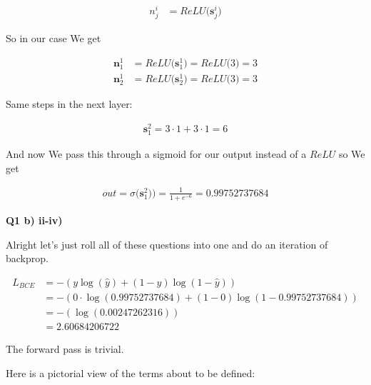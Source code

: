 \documentclass{article}
\begin{document}
	\begin{align}
		n^i_j &= ReLU\big(\mathbf{s}^i_j\big)
	\end{align}
	
	So in our case We get
	
	\begin{align}
		\mathbf{n}^1_1 &= ReLU\big(\mathbf{s}^1_1\big) =  ReLU\big( 3 \big) = 3\\
	\mathbf{n}^1_2 &= ReLU\big(\mathbf{s}^1_2\big) =  ReLU\big( 3 \big) = 3	
	\end{align}
	
	Same steps in the next layer:
	
	\begin{align}
		\mathbf{s}^2_1 = 3\cdot 1 + 3\cdot 1 = 6
	\end{align}
	
	And now We pass this through a sigmoid for our output instead of a $ReLU$ so We get
	
	\begin{align}
		out = \sigma\big(\mathbf{s}^2_1)\big) = \frac{1}{1+e^{-6}} = 0.99752737684
	\end{align}


	
\textbf{Q1 b) ii-iv)}

	Alright let's just roll all of these questions into one and do an iteration of backprop.

	\begin{align}
		L_{BCE} &= -(y\log(\hat{y}) + (1-y)\log(1-\hat{y}))\\
		&= -(0\cdot\log(0.99752737684) + (1-0)\log(1-0.99752737684))\\
		&= -(\log(0.00247262316))\\
		&= 2.60684206722
	\end{align}
	
	The forward pass is trivial.
	
	Here is a pictorial view of the terms about to be defined:
	
\end{document}
